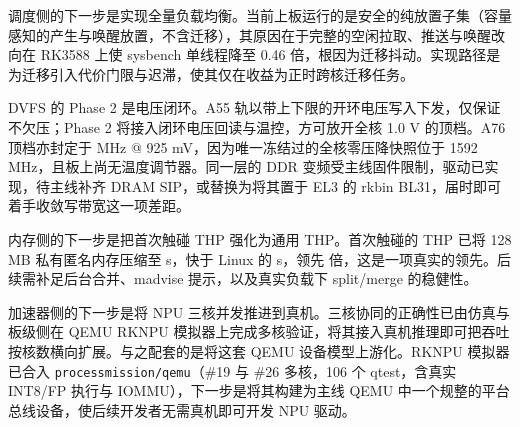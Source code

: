 调度侧的下一步是实现全量负载均衡。当前上板运行的是安全的纯放置子集（容量感知的产生与唤醒放置，不含迁移），其原因在于完整的空闲拉取、推送与唤醒改向在 RK3588 上使 sysbench 单线程降至 0.46 倍，根因为迁移抖动。实现路径是为迁移引入代价门限与迟滞，使其仅在收益为正时跨核迁移任务。

DVFS 的 Phase 2 是电压闭环。A55 轨以带上下限的开环电压写入下发，仅保证不欠压；Phase 2 将接入闭环电压回读与温控，方可放开全核 1.0 V 的顶档。A76 顶档亦封定于 \nDvfsAseven{} MHz @ 925 mV，因为唯一冻结过的全核零压降快照位于 1592 MHz，且板上尚无温度调节器。同一层的 DDR 变频受主线固件限制，驱动已实现，待主线补齐 DRAM SIP，或替换为将其置于 EL3 的 rkbin BL31，届时即可着手收敛写带宽这一项差距。

内存侧的下一步是把首次触碰 THP 强化为通用 THP。首次触碰的 THP 已将 128 MB 私有匿名内存压缩至 \nThpFT{} s，快于 Linux 的 \nThpFTLin{} s，领先 \nThpRatio{} 倍，这是一项真实的领先。后续需补足后台合并、madvise 提示，以及真实负载下 split/merge 的稳健性。

加速器侧的下一步是将 NPU 三核并发推进到真机。三核协同的正确性已由仿真与板级侧在 QEMU RKNPU 模拟器上完成多核验证，将其接入真机推理即可把吞吐按核数横向扩展。与之配套的是将这套 QEMU 设备模型上游化。RKNPU 模拟器已合入 \texttt{processmission/qemu}（\#19 与 \#26 多核，106 个 qtest，含真实 INT8/FP 执行与 IOMMU），下一步是将其构建为主线 QEMU 中一个规整的平台总线设备，使后续开发者无需真机即可开发 NPU 驱动。
